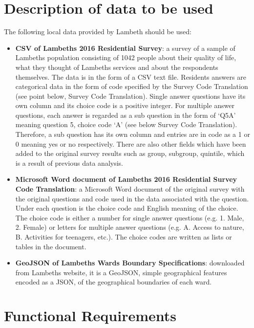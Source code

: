 \section{Description of data to be used}
The following local data provided by Lambeth should be used:
\begin{itemize}
  \item \textbf{CSV of Lambeth\textquotesingle s 2016 Residential Survey}: a survey of a sample of Lambeth\textquotesingle s population consisting of 1042 people about their quality of life, what they thought of Lambeth\textquotesingle s services and about the respondents themselves. The data is in the form of a CSV text file. Residents\textsc{}  answers are categorical data in the form of code specified by the Survey Code Translation (see point below, Survey Code Translation). Single answer questions have its own column and its choice code is a positive integer. For multiple answer questions, each answer is regarded as a sub question in the form of `Q5A' meaning question 5, choice code `A' (see below Survey Code Translation). Therefore, a sub question has its own column and entries are in code as a 1 or 0 meaning yes or no respectively. There are also other fields which have been added to the original survey results such as group, subgroup, quintile, which is a result of previous data analysis.
  \item \textbf{Microsoft Word document of Lambeth\textquotesingle s 2016 Residential Survey Code Translation}: a Microsoft Word document of the original survey with the original questions and code used in the data associated with the question. Under each question is the choice code and English meaning of the choice. The choice code is either a number for single answer questions (e.g. 1. Male, 2. Female) or letters for multiple answer questions (e.g. A. Access to nature, B. Activities for teenagers, etc.). The choice codes are written as lists or tables in the document.
  \item \textbf{GeoJSON of Lambeth\textquotesingle s Ward\textquotesingle s Boundary Specifications}: downloaded from Lambeth\textquotesingle s website, it is a GeoJSON, simple geographical features encoded as a JSON, of the geographical boundaries of each ward.
\end{itemize}

\section{Functional Requirements}

